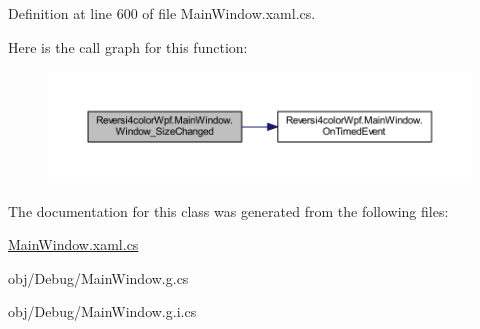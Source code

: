 Definition at line 600 of file Main\+Window.\+xaml.\+cs.



Here is the call graph for this function\+:
\nopagebreak
\begin{figure}[H]
\begin{center}
\leavevmode
\includegraphics[width=350pt]{class_reversi4color_wpf_1_1_main_window_a87821b553e20bd31063a850a48dd4882_cgraph}
\end{center}
\end{figure}




The documentation for this class was generated from the following files\+:\begin{DoxyCompactItemize}
\item 
\hyperlink{_main_window_8xaml_8cs}{Main\+Window.\+xaml.\+cs}\item 
obj/\+Debug/Main\+Window.\+g.\+cs\item 
obj/\+Debug/Main\+Window.\+g.\+i.\+cs\end{DoxyCompactItemize}
